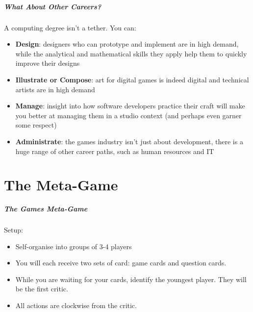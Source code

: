 \begin{frame}
	\frametitle{What About Other Careers?}
	
	A computing degree isn't a tether. You can:  \pause
	
	\begin{itemize}
		\item 	\textbf{Design}: designers who can prototype and implement are in high demand, while the analytical and mathematical skills they apply help them to quickly improve their designs \pause
		\item 	\textbf{Illustrate or Compose}: art for digital games is indeed digital and technical artists are in high demand \pause
		\item 	\textbf{Manage}: insight into how software developers practice their craft will make you better at managing them in a studio context 
			(and perhaps even garner some respect) \pause
		\item 	\textbf{Administrate}: the games industry isn't just about development, there is a huge range of other career paths,
			such as human resources and IT
	\end{itemize}
\end{frame}


\part{The Meta-Game}
\frame{\partpage}

\begin{frame}
	\frametitle{The Games Meta-Game}
	
	Setup:
	
	\begin{itemize}
		\item Self-organise into groups of 3-4 players
		\item You will each receive two sets of card: game cards and question cards.
		\item While you are waiting for your cards, identify the youngest player. They will be the first critic.
		\item All actions are clockwise from the critic.
	\end{itemize}
\end{frame}

